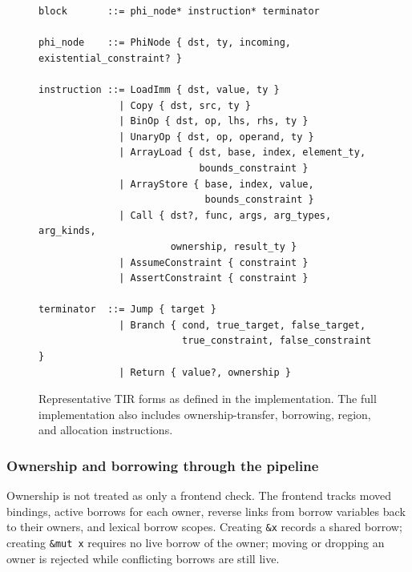 \begin{figure}[H]
\centering
\begin{verbatim}
block       ::= phi_node* instruction* terminator

phi_node    ::= PhiNode { dst, ty, incoming, existential_constraint? }

instruction ::= LoadImm { dst, value, ty }
              | Copy { dst, src, ty }
              | BinOp { dst, op, lhs, rhs, ty }
              | UnaryOp { dst, op, operand, ty }
              | ArrayLoad { dst, base, index, element_ty, 
                            bounds_constraint }
              | ArrayStore { base, index, value,
                             bounds_constraint }
              | Call { dst?, func, args, arg_types, arg_kinds, 
                       ownership, result_ty }
              | AssumeConstraint { constraint }
              | AssertConstraint { constraint }

terminator  ::= Jump { target }
              | Branch { cond, true_target, false_target,
                         true_constraint, false_constraint }
              | Return { value?, ownership }
\end{verbatim}
\caption{Representative TIR forms as defined in the implementation. The full implementation also includes ownership-transfer, borrowing, region, and allocation instructions.}
\label{fig:tir-syntax}
\end{figure}

\subsubsection{Ownership and borrowing through the pipeline}

Ownership is not treated as only a frontend check. The frontend tracks moved bindings, active borrows for each owner, reverse links from borrow variables back to their owners, and lexical borrow scopes. Creating \texttt{\&x} records a shared borrow; creating \texttt{\&mut x} requires no live borrow of the owner; moving or dropping an owner is rejected while conflicting borrows are still live.

